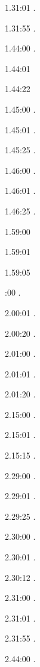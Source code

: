 \documentclass[italian]{article}
\begin{document}
1.31:01   .

1.31:55   .

1.44:00   .

1.44:01   

1.44:22   

1.45:00   .

1.45:01   .

1.45:25   .

1.46:00   .

1.46:01   .

1.46:25   .

1.59:00   

1.59:01   

1.59:05   

:00  .

2.00:01   . 

2.00:20  .

2.01:00   . 

2.01:01  .

2.01:20   . 

2.15:00   . 

2.15:01   . 

2.15:15   . 

2.29:00   . 

2.29:01   . 

2.29:25   . 

2.30:00   .

2.30:01   .

2.30:12   .

2.31:00   .

2.31:01   .

2.31:55   .

2.44:00   .
\end{document}
